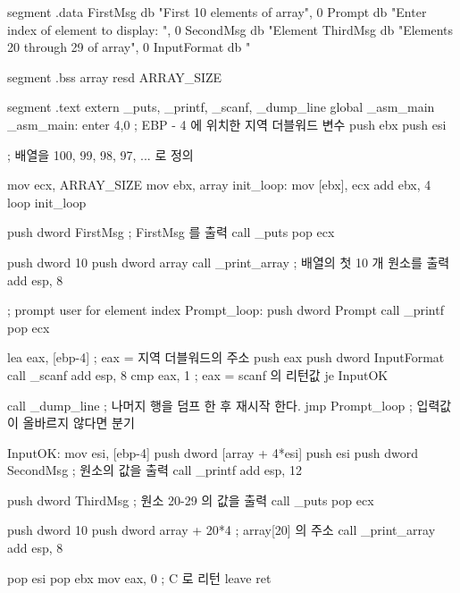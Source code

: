 \begin{AsmCodeListing}[label=array1.asm]

segment .data
FirstMsg        db   "First 10 elements of array", 0
Prompt          db   "Enter index of element to display: ", 0
SecondMsg       db   "Element %
ThirdMsg        db   "Elements 20 through 29 of array", 0
InputFormat     db   "%

segment .bss
array           resd ARRAY_SIZE

segment .text
        extern  _puts, _printf, _scanf, _dump_line
        global  _asm_main
_asm_main:
        enter   4,0		; EBP - 4 에 위치한 지역 더블워드 변수 
        push    ebx
        push    esi

; 배열을 100, 99, 98, 97, ... 로 정의

        mov     ecx, ARRAY_SIZE
        mov     ebx, array
init_loop:
        mov     [ebx], ecx
        add     ebx, 4
        loop    init_loop

        push    dword FirstMsg         ; FirstMsg 를 출력
        call    _puts
        pop     ecx

        push    dword 10
        push    dword array
        call    _print_array           ; 배열의 첫 10 개 원소를 출력
        add     esp, 8

; prompt user for element index
Prompt_loop:
        push    dword Prompt
        call    _printf
        pop     ecx

        lea     eax, [ebp-4]      ; eax = 지역 더블워드의 주소
        push    eax
        push    dword InputFormat
        call    _scanf
        add     esp, 8
        cmp     eax, 1               ; eax = scanf 의 리턴값
        je      InputOK

        call    _dump_line  ; 나머지 행을 덤프 한 후 재시작 한다.
        jmp     Prompt_loop          ; 입력값이 올바르지 않다면 분기

InputOK:
        mov     esi, [ebp-4]
        push    dword [array + 4*esi]
        push    esi
        push    dword SecondMsg      ; 원소의 값을 출력
        call    _printf
        add     esp, 12

        push    dword ThirdMsg       ; 원소 20-29 의 값을 출력
        call    _puts
        pop     ecx

        push    dword 10
        push    dword array + 20*4     ; array[20] 의 주소
        call    _print_array
        add     esp, 8

        pop     esi
        pop     ebx
        mov     eax, 0            ; C 로 리턴
        leave                     
        ret


\end{AsmCodeListing}
